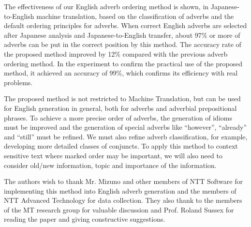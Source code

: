 The effectiveness of our English adverb ordering method is shown, in
Japanese-to-English machine translation, based on the classification
of adverbs and the default ordering principles for adverbs.
When correct English adverbs are selected after Japanese analysis and
Japanese-to-English transfer, about 97\% or more of adverbs can be put
in the correct position by this method.  
The accuracy rate of the proposed method improved by 12\% compared with 
the previous adverb ordering method.
In the experiment to confirm the practical use of the proposed method,
it achieved an accuracy of 99\%, which confirms its efficiency with 
real problems.

The proposed method is not restricted to Machine Translation, but can
be used for English generation in general, both for adverbs and
adverbial prepositional phrases.  To achieve a more precise order of
adverbs, the generation of idioms must be improved and the
generation of special adverbs like ``however'', ``already'' and ``still'' 
must be refined.  We must also refine adverb
classification, for example, developing more detailed classes of
conjuncts.  To apply this method to context sensitive text where
marked order may be important, we will also need to consider old/new
information, topic and importance of the information.


\acknowledgment

The authors wish to thank Mr. Mizuno and other members of NTT Software for 
implementing this method into English adverb generation and the members of 
NTT Advanced Technology for data collection. They also thank to the members 
of the MT research group for valuable discussion and Prof. Roland Sussex 
for reading the paper and giving constructive suggestions.

